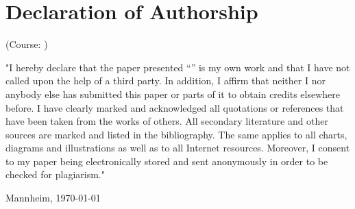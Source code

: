 \clearpage
\chapter*{Declaration of Authorship}


\begin{center}
(Course: \textit{\DieKursbezeichnung})

"I hereby declare that the paper presented ``\textit{\DerTitelDerArbeit}'' is my own work and that I have not called upon the help of a third party. In addition, I affirm that neither I nor anybody else has submitted this paper or parts of it to obtain credits elsewhere before. I have clearly marked and acknowledged all quotations or references that have been taken from the works of others. All secondary literature and other sources are marked and listed in the bibliography. The same applies to all charts, diagrams and illustrations as well as to all Internet resources. Moreover, I consent to my paper being electronically stored and sent anonymously in order to be checked for plagiarism."

\vspace{3cm}
\DerAutorDerArbeit

Mannheim, \today 

\end{center}